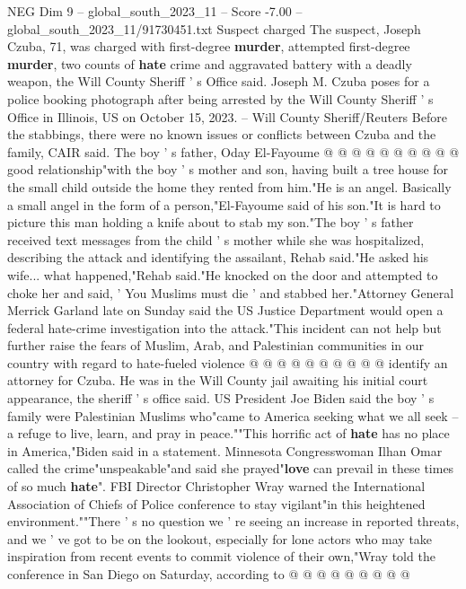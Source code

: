 \begin{textsample}{NEG Dim 9 – global\_south\_2023\_11 – Score -7.00 – global\_south\_2023\_11/91730451.txt}
Suspect charged The suspect, Joseph Czuba, 71, was charged with first-degree \textbf{murder}, attempted first-degree \textbf{murder}, two counts of \textbf{hate} crime and aggravated battery with a deadly weapon, the Will County Sheriff ' s Office said.
Joseph M.
Czuba poses for a police booking photograph after being arrested by the Will County Sheriff ' s Office in Illinois, US on October 15, 2023. -- Will County Sheriff/Reuters Before the stabbings, there were no known issues or conflicts between Czuba and the family, CAIR said.
The boy ' s father, Oday El-Fayoume @ @ @ @ @ @ @ @ @ @ good relationship"with the boy ' s mother and son, having built a tree house for the small child outside the home they rented from him."He is an angel.
Basically a small angel in the form of a person,"El-Fayoume said of his son."It is hard to picture this man holding a knife about to stab my son."The boy ' s father received text messages from the child ' s mother while she was hospitalized, describing the attack and identifying the assailant, Rehab said."He asked his wife... what happened,"Rehab said."He knocked on the door and attempted to choke her and said, ' You Muslims must die ' and stabbed her."Attorney General Merrick Garland late on Sunday said the US Justice Department would open a federal hate-crime investigation into the attack."This incident can not help but further raise the fears of Muslim, Arab, and Palestinian communities in our country with regard to hate-fueled violence @ @ @ @ @ @ @ @ @ @ identify an attorney for Czuba.
He was in the Will County jail awaiting his initial court appearance, the sheriff ' s office said.
US President Joe Biden said the boy ' s family were Palestinian Muslims who"came to America seeking what we all seek -- a refuge to live, learn, and pray in peace.""This horrific act of \textbf{hate} has no place in America,"Biden said in a statement.
Minnesota Congresswoman Ilhan Omar called the crime"unspeakable"and said she prayed"\textbf{love} can prevail in these times of so much \textbf{hate}".
FBI Director Christopher Wray warned the International Association of Chiefs of Police conference to stay vigilant"in this heightened environment.""There ' s no question we ' re seeing an increase in reported threats, and we ' ve got to be on the lookout, especially for lone actors who may take inspiration from recent events to commit violence of their own,"Wray told the conference in San Diego on Saturday, according to @ @ @ @ @ @ @ @ @

\end{textsample}
